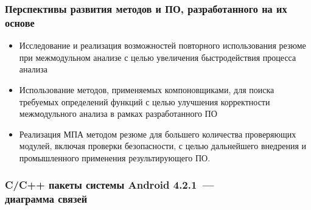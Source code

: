 \documentclass[hyperref={pdfpagelabels=false},10pt,gray]{beamer}
\begin{document}
\begin{frame}
\frametitle{Перспективы развития методов и ПО, разработанного на их основе}
\begin{itemize}
  \item Исследование и реализация возможностей повторного использования резюме при межмодульном анализе с целью увеличения быстродействия процесса анализа
  \item Использование методов, применяемых компоновщиками, для поиска требуемых определений функций с целью улучшения корректности межмодульного анализа в рамках разработанного ПО
  \item Реализация МПА методом резюме для большего количества проверяющих модулей, включая проверки безопасности, с целью дальнейшего внедрения и промышленного применения результирующего ПО. 
\end{itemize}
\end{frame}

\begin{frame}
\frametitle{C/C++ пакеты системы Android 4.2.1~---\\диаграмма связей}
\begin{figure}[h]
\end{figure}
\end{frame}
\end{document}
